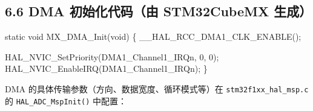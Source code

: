 \documentclass[
  chinese,
  UTF8,
  oneside,
  openany]{ctexbook}
\newenvironment{Shaded}{}{}
\newcommand{\DataTypeTok}[1]{\textcolor[rgb]{0.56,0.13,0.00}{#1}}
\newcommand{\DecValTok}[1]{\textcolor[rgb]{0.25,0.63,0.44}{#1}}
\newcommand{\NormalTok}[1]{#1}
\newcommand{\OperatorTok}[1]{\textcolor[rgb]{0.40,0.40,0.40}{#1}}
\begin{document}
\subsection{6.6 DMA 初始化代码（由 STM32CubeMX
生成）}\label{dma-ux521dux59cbux5316ux4ee3ux7801ux7531-stm32cubemx-ux751fux6210}

\begin{Shaded}
\begin{Highlighting}[]
\DataTypeTok{static} \DataTypeTok{void}\NormalTok{ MX\_DMA\_Init}\OperatorTok{(}\DataTypeTok{void}\OperatorTok{)}
\OperatorTok{\{}
\NormalTok{    \_\_HAL\_RCC\_DMA1\_CLK\_ENABLE}\OperatorTok{();}

\NormalTok{    HAL\_NVIC\_SetPriority}\OperatorTok{(}\NormalTok{DMA1\_Channel1\_IRQn}\OperatorTok{,} \DecValTok{0}\OperatorTok{,} \DecValTok{0}\OperatorTok{);}
\NormalTok{    HAL\_NVIC\_EnableIRQ}\OperatorTok{(}\NormalTok{DMA1\_Channel1\_IRQn}\OperatorTok{);}
\OperatorTok{\}}
\end{Highlighting}
\end{Shaded}

DMA 的具体传输参数（方向、数据宽度、循环模式等）在
\texttt{stm32f1xx\_hal\_msp.c} 的 \texttt{HAL\_ADC\_MspInit()} 中配置：
\end{document}
